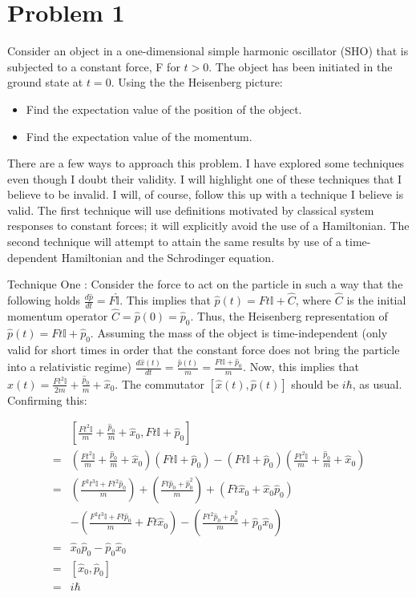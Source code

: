 \documentclass[aps,prl,preprint,groupedaddress]{revtex4-1}
\begin{document}
\section{Problem 1}

Consider an object in a one-dimensional simple harmonic oscillator (SHO) that is subjected to a constant force, F for $t>0$. The object has been initiated in the ground state at $t=0$. Using the the Heisenberg picture:

\begin{itemize}
\item Find the expectation value of the position of the object.
\item Find the expectation value of the momentum.
\end{itemize}

There are a few ways to approach this problem. I have explored some techniques even though I doubt their validity. I will highlight one of these techniques that I believe to be invalid. I will, of course, follow this up with a technique I believe is valid. The first technique will use definitions motivated by classical system responses to constant forces; it will explicitly avoid the use of a Hamiltonian. The second technique will attempt to attain the same results by use of a time-dependent Hamiltonian and the Schrodinger equation. 

Technique One : Consider the force to act on the particle in such a way that the following holds $\frac{d\hat{p}}{dt} = F\hat{\mathbb{I}}$. This implies that $\hat{p}(t)=Ft\mathbb{I}+\hat{C}$, where $\hat{C}$ is the initial momentum operator $\hat{C}=\hat{p}(0)=\hat{p}_0$. Thus, the Heisenberg representation of $\hat{p}(t)=Ft\mathbb{I}+\hat{p}_0$. Assuming the mass of the object is time-independent (only valid for short times in order that the constant force does not bring the particle into a relativistic regime) $\frac{d\hat{x}(t)}{dt} = \frac{\hat{p}(t)}{m}=\frac{Ft\mathbb{I}+\hat{p}_0}{m}$. Now, this implies that $\hat{x}(t)=\frac{Ft^2\mathbb{I}}{2m}+\frac{\hat{p}_0}{m}+\hat{x}_0$. The commutator $[\hat{x}(t),\hat{p}(t)]$ should be $i\hbar$, as usual. Confirming this:

\begin{align}
&[\frac{Ft^2\mathbb{I}}{m}+\frac{\hat{p}_0}{m}+\hat{x}_0,Ft\mathbb{I}+\hat{p}_0]\\
=&(\frac{Ft^2\mathbb{I}}{m}+\frac{\hat{p}_0}{m}+\hat{x}_0)(Ft\mathbb{I}+\hat{p}_0)-(Ft\mathbb{I}+\hat{p}_0)(\frac{Ft^2\mathbb{I}}{m}+\frac{\hat{p}_0}{m}+\hat{x}_0)\\
=&(\frac{F^2t^3\mathbb{I}+Ft^2\hat{p}_0}{m})+(\frac{Ft\hat{p}_0+\hat{p}^2_0}{m})+(Ft\hat{x}_0+\hat{x}_0\hat{p}_0)\\
&-(\frac{F^2t^3\mathbb{I}+Ft\hat{p}_0}{m}+Ft\hat{x}_0)-(\frac{Ft^2\hat{p}_0+\hat{p}^2_0}{m}+\hat{p}_0\hat{x}_0)\\
=&\hat{x}_0\hat{p}_0-\hat{p}_0\hat{x}_0\\
=&[\hat{x}_0,\hat{p}_0]\\
=&i\hbar
\end{align}
\end{document}
